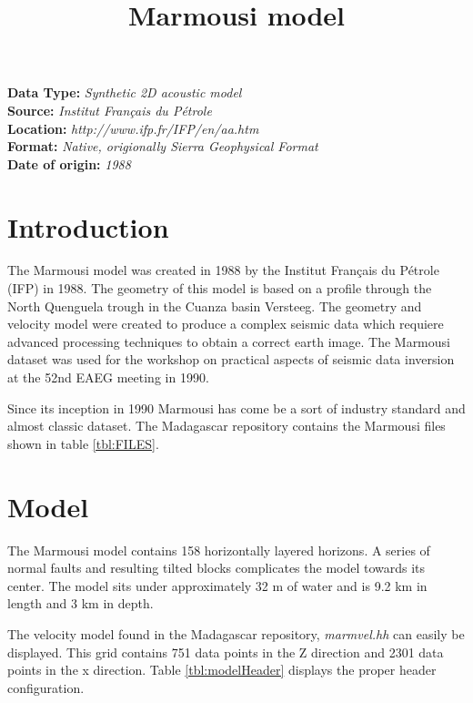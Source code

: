 \title{Marmousi model}
\author{}
\lstset{language=python,numbers=left,numberstyle=\tiny,showstringspaces=false}

\maketitle
\noindent
\textbf {Data Type:} \emph{Synthetic 2D acoustic model}\\
\textbf {Source:} \emph{Institut Fran\c{c}ais du P\'{e}trole}\\
\textbf {Location:} \emph{http://www.ifp.fr/IFP/en/aa.htm}\\
\textbf {Format:} \emph{Native, origionally Sierra Geophysical Format} \\
\textbf{Date of origin:} \emph{1988}\\

\section{Introduction}
The Marmousi model was created in 1988 by the Institut Fran\c{c}ais du P\'{e}trole (IFP) in 1988.  The geometry of this model is based on a profile through the North Quenguela trough in the Cuanza basin Versteeg. The geometry and velocity model were created to produce a complex seismic data which requiere advanced processing techniques to obtain a correct earth image. The Marmousi dataset was used for the workshop on practical aspects of seismic data inversion at the 52nd EAEG meeting in 1990.

Since its inception in 1990 Marmousi has come be a sort of industry standard and almost classic dataset. The Madagascar repository contains the Marmousi files shown in table \ref{tbl:FILES}.

{
\tiny

\normalsize
}

\section{Model}
The Marmousi model contains 158 horizontally layered horizons.  A series of normal faults and resulting tilted blocks complicates the model towards its center.  The model sits under approximately 32 m of water and is 9.2 km in length and 3 km in depth.  

The velocity model found in the Madagascar repository, \emph{marmvel.hh} can easily be displayed.  This grid contains 751 data points in the Z direction and 2301 data points in the x direction.  Table \ref{tbl:modelHeader} displays the proper header configuration.  

